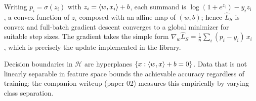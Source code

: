 \documentclass[11pt]{article}
\begin{document}
\begin{remark}[Convexity]
Writing $p_i = \sigma(z_i)$ with $z_i = \langle w, x_i \rangle + b$, each summand is
$\log(1 + e^{z_i}) - y_i z_i$, a convex function of $z_i$ composed with an
affine map of $(w, b)$; hence $\widehat{L}_S$ is convex and full-batch
gradient descent converges to a global minimizer for suitable step sizes.
The gradient takes the simple form
$\nabla_w \widehat{L}_S = \frac{1}{n} \sum_i (p_i - y_i)\, x_i$, which is
precisely the update implemented in the library.
\end{remark}

\begin{remark}
Decision boundaries in $\mathcal{H}$ are hyperplanes
$\{x : \langle w, x \rangle + b = 0\}$. Data that is not linearly separable in feature
space bounds the achievable accuracy regardless of training; the companion
writeup (paper 02) measures this empirically by varying class separation.
\end{remark}
\end{document}
